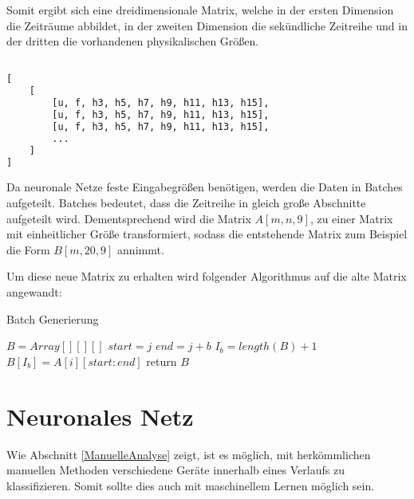     \noindent
    Somit ergibt sich eine dreidimensionale Matrix, welche in der ersten Dimension die Zeiträume abbildet, in der zweiten Dimension die sekündliche Zeitreihe und in der dritten die vorhandenen physikalischen Größen.

    \begin{lstlisting}[language=Python, caption={Datenstruktur der gelabelten Messdaten, die von der API bereit gestellt wird},label=lst:DatenstrukturGelabelteMessdaten]

[
    [
        [u, f, h3, h5, h7, h9, h11, h13, h15],
        [u, f, h3, h5, h7, h9, h11, h13, h15],
        [u, f, h3, h5, h7, h9, h11, h13, h15],
        ...
    ]
]
    \end{lstlisting}

    Da neuronale Netze feste Eingabegrößen benötigen, werden die Daten in Batches aufgeteilt.
    Batches bedeutet, dass die Zeitreihe in gleich große Abschnitte aufgeteilt wird.
    Dementsprechend wird die Matrix \( A[m, n, 9] \), zu einer Matrix mit einheitlicher Größe transformiert, sodass die entstehende Matrix zum Beispiel die Form \( B[m, 20, 9] \) annimmt.
    \newline

    \noindent
    Um diese neue Matrix zu erhalten wird folgender Algorithmus auf die alte Matrix angewandt:

    \begin{algorithm}\label{alg:BatchGenerierung}
        \caption{Batch Generierung}
        \begin{algorithmic}[1]
        \State{}
            \State ${B} = Array[][][]$
                    \State $start = j$
                    \State $end = j + b$ 
                    \State $I_b = length(B) + 1$
                    \State $B[I_b] = A[i][start : end]$
                \EndFor
            \EndFor
            \State return $B$
        \EndFunction
        \end{algorithmic}
    \end{algorithm}

\section{Neuronales Netz}
    Wie Abschnitt \ref{ManuelleAnalyse} zeigt, ist es möglich, mit herkömmlichen manuellen Methoden verschiedene Geräte innerhalb eines Verlaufs zu klassifizieren.
    Somit sollte dies auch mit maschinellem Lernen möglich sein.
    \newline

